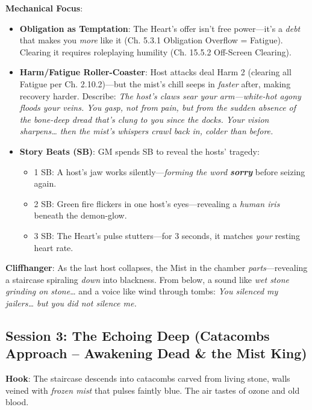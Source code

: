 \documentclass[12pt]{article}
\begin{document}
\textbf{Mechanical Focus}:
\begin{itemize}
  \item \textbf{Obligation as Temptation}: The Heart's offer isn't free power---it's a \textit{debt} that makes you \textit{more} like it (Ch. 5.3.1 Obligation Overflow = Fatigue). Clearing it requires roleplaying humility (Ch. 15.5.2 Off-Screen Clearing).
  \item \textbf{Harm/Fatigue Roller-Coaster}: Host attacks deal Harm 2 (clearing all Fatigue per Ch. 2.10.2)---but the mist's chill seeps in \textit{faster} after, making recovery harder. Describe: \textit{The host's claws sear your arm---white-hot agony floods your veins. You gasp, not from pain, but from the sudden absence of the bone-deep dread that's clung to you since the docks. Your vision sharpens\ldots{} then the mist's whispers crawl back in, colder than before.}
  \item \textbf{Story Beats (SB)}: GM spends SB to reveal the hosts' tragedy:
  \begin{itemize}
    \item 1 SB: A host's jaw works silently---\textit{forming the word \textbf{sorry}} before seizing again.
    \item 2 SB: Green fire flickers in one host's eyes---revealing a \textit{human iris} beneath the demon-glow.
    \item 3 SB: The Heart's pulse stutters---for 3 seconds, it matches \textit{your} resting heart rate.
  \end{itemize}
\end{itemize}

\textbf{Cliffhanger}: As the last host collapses, the Mist in the chamber \textit{parts}---revealing a staircase spiraling \textit{down} into blackness. From below, a sound like \textit{wet stone grinding on stone}\ldots{} and a voice like wind through tombs: \textit{You silenced my jailers\ldots{} but you did not silence me.}

\subsection{Session 3: The Echoing Deep (Catacombs Approach -- Awakening Dead \& the Mist King)}
\textbf{Hook}: The staircase descends into catacombs carved from living stone, walls veined with \textit{frozen mist} that pulses faintly blue. The air tastes of ozone and old blood.
\end{document}
